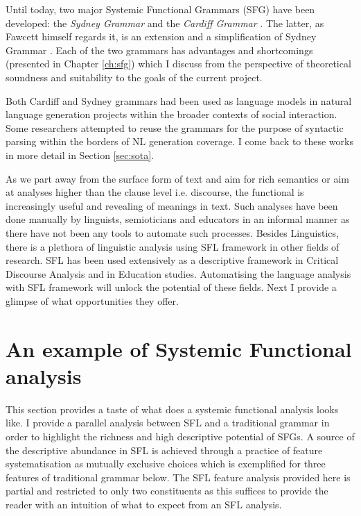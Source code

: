 
% 
Until today, two major Systemic Functional Grammars (SFG) have been developed: the \textit{Sydney Grammar} \citep{Halliday2013} and the \textit{Cardiff Grammar} \citep{Fawcett2008}. The latter, as Fawcett himself regards it, is an extension and a simplification of Sydney Grammar \citep[xviii]{Fawcett2008}. Each of the two grammars has advantages and shortcomings (presented in Chapter \ref{ch:sfg}) which I discuss from the perspective of theoretical soundness and suitability to the goals of the current project.

Both Cardiff and Sydney grammars had been used as language models in natural language generation projects within 
the broader contexts of social interaction. Some researchers \citep{Kasper1988, ODonoghue1991a, ODonnell1993, Souter1996, Day2007} attempted to reuse the grammars for the purpose of syntactic parsing within the borders of NL generation coverage. I come back to these works in more detail in Section \ref{sec:sota}.

As we part away from the surface form of text and aim for rich semantics or aim at analyses higher than the clause level i.e. discourse, the functional is increasingly useful and revealing of meanings in text. Such analyses have been done manually by linguists, semioticians and educators in an informal manner as there have not been any tools to automate such processes. Besides Linguistics, there is a plethora of linguistic analysis using SFL framework in other fields of research. SFL has been used extensively as a descriptive framework in Critical Discourse Analysis and in Education studies. Automatising the language analysis with SFL framework will unlock the potential of these fields. Next I provide a glimpse of what opportunities they offer. 

\section{An example of Systemic Functional analysis}
\label{sec:example}
This section provides a taste of what does a systemic functional analysis looks like. I provide a parallel analysis between SFL and a traditional grammar in order to highlight the richness and high descriptive potential of SFGs. A source of the descriptive abundance in SFL is achieved through a practice of feature systematisation as mutually exclusive choices which is exemplified for three features of traditional grammar below. The SFL feature analysis provided here is partial and restricted to only two constituents as this suffices to provide the reader with an intuition of what to expect from an SFL analysis.

